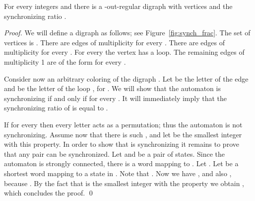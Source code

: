 \documentclass[runningheads]{llncs}
\begin{document}
\begin{theorem}
For every integers  and  there is a -out-regular digraph with  vertices and the synchronizing ratio .
\end{theorem}
\begin{proof}
We will define a digraph  as follows; see Figure~\ref{fig:synch_frac}. The set of vertices  is . There are edges  of multiplicity  for every . There are edges  of multiplicity  for every .
For every  the vertex  has a loop.
The remaining edges of multiplicity 1 are of the form  for every .

Consider now an arbitrary coloring  of the digraph .
Let  be the letter of the edge  and  be the letter of the loop , for .
We will show that the automaton  is synchronizing if and only if  for every .
It will immediately imply that the synchronizing ratio of  is equal to .

If  for every  then every letter acts as a permutation; thus the automaton is not synchronizing.
Assume now that there is  such , and let  be the smallest integer with this property.
In order to show that  is synchronizing it remains to prove that any pair can be synchronized. Let  and  be a pair of states. Since the automaton is strongly connected, there is a word  mapping  to . Let .
Let  be a shortest word mapping  to a state in . Note that .
Now we have , and also , because .
By the fact that  is the smallest integer with the property  we obtain , which concludes the proof.
\qed
\end{proof}
\end{document}
